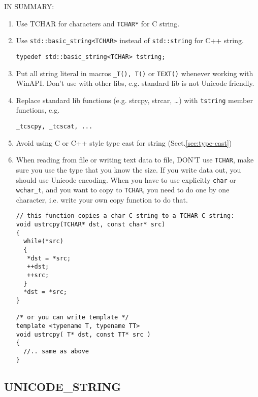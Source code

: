IN SUMMARY:
\begin{enumerate}
  \item Use TCHAR for characters and \verb!TCHAR*! for C string.
  
  \item Use \verb!std::basic_string<TCHAR>! instead of \verb!std::string! for
  C++ string.
  
\begin{verbatim}
typedef std::basic_string<TCHAR> tstring; 
\end{verbatim}  

  \item Put all string literal in macros \verb!_T(), T()! or \verb!TEXT()!
  whenever working with WinAPI. Don't use with other libs, e.g. standard lib is
  not Unicode friendly.
  
  \item Replace standard lib functions (e.g. strcpy, strcar, \ldots) with
  \verb!tstring! member functions, e.g. 
\begin{verbatim}
_tcscpy, _tcscat, ...
\end{verbatim}
  
  \item Avoid using C or C++ style type cast for
  string (Sect.\ref{sec:type-cast})
  
  \item When reading from file or writing text data to file, DON'T use
  \verb!TCHAR!, make sure you use the type that you know the size.  If you write
  data out, you should use Unicode encoding. When you have to use explicitly
  \verb!char! or \verb!wchar_t!, and you want to copy to \verb!TCHAR!, you need
  to do one by one character, i.e. write your own copy function to do that.
  
\begin{Verbatim}
// this function copies a char C string to a TCHAR C string:
void ustrcpy(TCHAR* dst, const char* src)
{
  while(*src)
  {
   *dst = *src;
   ++dst;
   ++src;
  }
  *dst = *src;
}

/* or you can write template */
template <typename T, typename TT>
void ustrcpy( T* dst, const TT* src )
{
  //.. same as above
}
\end{Verbatim}
  
\end{enumerate}

\subsection{UNICODE\_STRING}


